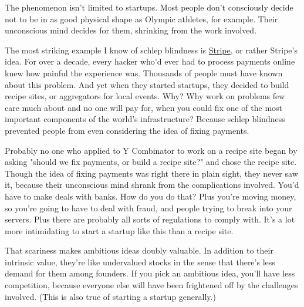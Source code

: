 The phenomenon isn't limited to
                    startups. Most people don't consciously decide not to be in
                    as good physical shape as Olympic athletes, for example.
                    Their unconscious mind decides for them, shrinking from the
                    work involved.

The most striking example I know
                    of schlep blindness is
                    \href{http://stripe.com}{Stripe}, or rather Stripe's
                    idea. For over a decade, every hacker who'd ever had to
                    process payments online knew how painful the experience was.
                    Thousands of people must have known about this problem. And
                    yet when they started startups, they decided to build recipe
                    sites, or aggregators for local events. Why? Why work on
                    problems few care much about and no one will pay for, when
                    you could fix one of the most important components of the
                    world's infrastructure? Because schlep blindness prevented
                    people from even considering the idea of fixing payments.

Probably
                    no one who applied to Y Combinator to work on a recipe site
                    began by asking "should we fix payments, or build a recipe
                    site?" and chose the recipe site. Though the idea of fixing
                    payments was right there in plain sight, they never saw it,
                    because their unconscious mind shrank from the complications
                    involved. You'd have to make deals with banks. How do you do
                    that? Plus you're moving money, so you're going to have to
                    deal with fraud, and people trying to break into your
                    servers. Plus there are probably all sorts of regulations to
                    comply with. It's a lot more intimidating to start a startup
                    like this than a recipe site.

That scariness
                    makes ambitious ideas doubly valuable. In addition to their
                    intrinsic value, they're like undervalued stocks in the
                    sense that there's less demand for them among founders. If
                    you pick an ambitious idea, you'll have less competition,
                    because everyone else will have been frightened off by the
                    challenges involved. (This is also true of starting a
                    startup generally.)

